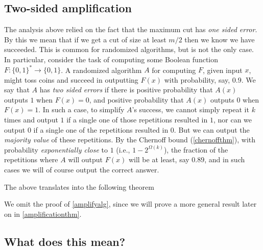 \subsection{Two-sided amplification}\label{Two-sided-amplification}

The analysis above relied on the fact that the maximum cut has \emph{one
sided error}. By this we mean that if we get a cut of size at least
\(m/2\) then we know we have succeeded. This is common for randomized
algorithms, but is not the only case. In particular, consider the task
of computing some Boolean function \(F:\{0,1\}^* \rightarrow \{0,1\}\).
A randomized algorithm \(A\) for computing \(F\), given input \(x\),
might toss coins and succeed in outputting \(F(x)\) with probability,
say, \(0.9\). We say that \(A\) has \emph{two sided errors} if there is
positive probability that \(A(x)\) outputs \(1\) when \(F(x)=0\), and
positive probability that \(A(x)\) outputs \(0\) when \(F(x)=1\). In
such a case, to simplify \(A\)'s success, we cannot simply repeat it
\(k\) times and output \(1\) if a single one of those repetitions
resulted in \(1\), nor can we output \(0\) if a single one of the
repetitions resulted in \(0\). But we can output the \emph{majority
value} of these repetitions. By the Chernoff bound (\cref{chernoffthm}),
with probability \emph{exponentially close} to \(1\) (i.e.,
\(1-2^{\Omega(k)}\)), the fraction of the repetitions where \(A\) will
output \(F(x)\) will be at least, say \(0.89\), and in such cases we
will of course output the correct answer.

The above translates into the following theorem

\hypertarget{amplifyalg}{}

We omit the proof of \cref{amplifyalg}, since we will prove a more
general result later on in \cref{amplificationthm}.

\subsection{What does this mean?}\label{What-does-this-mean}

